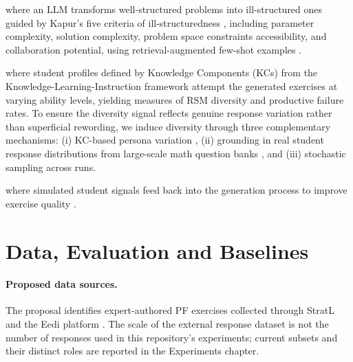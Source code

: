 \begin{description}
    \setlength{\itemsep}{0.5em}

    \item[\textbf{(1) Exercise generation}] where an LLM transforms well-structured problems into ill-structured ones guided by Kapur's  five criteria of ill-structuredness \cite{kapur2009}, including parameter complexity, solution complexity, problem space constraints accessibility, and collaboration potential, using retrieval-augmented few-shot examples \cite{puech2025}.
    \item[\textbf{(2) Simulated student evaluation}] where student profiles defined by Knowledge Components (KCs) from the Knowledge-Learning-Instruction framework \cite{lu2024} attempt the generated exercises at varying ability levels, yielding measures of RSM diversity and productive failure rates. To ensure the diversity signal reflects genuine response variation rather than superficial rewording, we induce diversity through three complementary mechanisms: (i) KC-based persona variation \cite{lu2024}, (ii) grounding in real student response distributions from large-scale math question banks \cite{wang2021eedi}, and (iii) stochastic sampling across runs.
    \item[\textbf{(3) Iterative refinement}] where simulated student signals feed back into the generation process to improve exercise quality \cite{madaan2023selfrefine}.
\end{description}
\section*{Data, Evaluation and Baselines}

\paragraph{Proposed data sources.} The proposal identifies expert-authored PF exercises collected through StratL \cite{puech2025} and the Eedi platform \cite{wang2021eedi}. The scale of the external response dataset is not the number of responses used in this repository's experiments; current subsets and their distinct roles are reported in the Experiments chapter.

